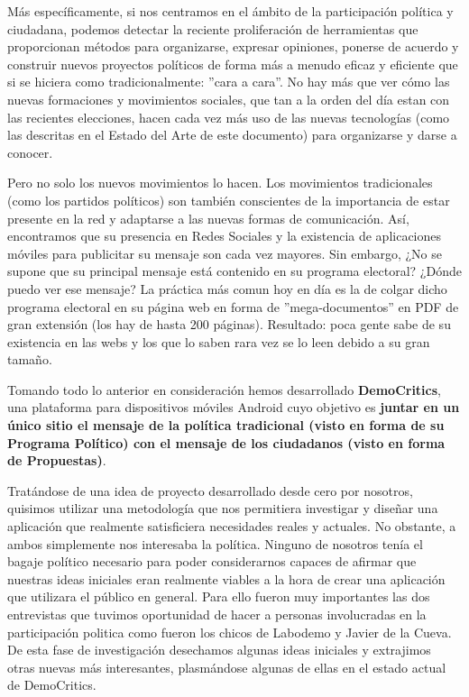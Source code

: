 Más específicamente, si nos centramos en el ámbito de la participación política y ciudadana, podemos detectar la reciente proliferación de herramientas que proporcionan métodos para organizarse, expresar opiniones, ponerse de acuerdo y construir nuevos proyectos políticos de forma más a menudo eficaz y eficiente que si se hiciera como tradicionalmente: ''cara a cara''. No hay más que ver cómo las nuevas formaciones y movimientos sociales, que tan a la orden del día estan con las recientes elecciones, hacen cada vez más uso de las nuevas tecnologías (como las descritas en el Estado del Arte de este documento) para organizarse y darse a conocer. 

Pero no solo los nuevos movimientos lo hacen. Los movimientos tradicionales (como los partidos políticos) son también conscientes de la importancia de estar presente en la red y adaptarse a las nuevas formas de comunicación. Así, encontramos que su presencia en Redes Sociales y la existencia de aplicaciones móviles para publicitar su mensaje son cada vez mayores. Sin embargo,   ¿No se supone que su principal mensaje está contenido en su programa electoral? ¿Dónde puedo ver ese mensaje? La práctica más comun hoy en día es la de colgar dicho programa electoral en su página web en forma de ''mega-documentos'' en PDF de gran extensión (los hay de hasta 200 páginas). Resultado: poca gente sabe de su existencia en las webs y los que lo saben rara vez se lo leen debido a su gran tamaño.

Tomando todo lo anterior en consideración hemos desarrollado \textbf{DemoCritics}, una plataforma para dispositivos móviles Android cuyo objetivo es \textbf{juntar en un único sitio el mensaje de la política tradicional (visto en forma de su Programa Político) con el mensaje de los ciudadanos (visto en forma de Propuestas)}.

Tratándose de una idea de proyecto desarrollado desde cero por nosotros, quisimos utilizar una metodología que nos permitiera investigar y diseñar una aplicación que realmente satisficiera necesidades reales y actuales. No obstante, a ambos simplemente nos interesaba la política. Ninguno de nosotros tenía el bagaje político necesario para poder considerarnos capaces de afirmar que nuestras ideas iniciales eran realmente viables a la hora de crear una aplicación que utilizara el público en general. Para ello fueron muy importantes las dos entrevistas que tuvimos oportunidad de hacer a personas involucradas en la participación politica como fueron los chicos de Labodemo y Javier de la Cueva. De esta fase de investigación desechamos algunas ideas iniciales y extrajimos otras nuevas más interesantes, plasmándose algunas de ellas en el estado actual de DemoCritics. 

